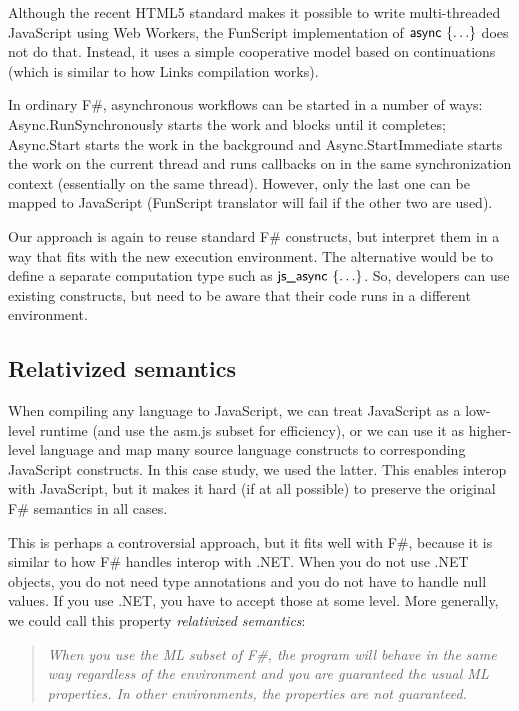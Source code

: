\documentclass[submission,copyright,creativecommons]{eptcs}
\newcommand{\kvd}[1]{\textnormal{\textcolor{kvdclr}{\sffamily #1}}}
\newcommand{\ident}[1]{\textnormal{\sffamily #1}}
\begin{document}
Although the recent HTML5 standard makes it possible to write multi-threaded JavaScript using
Web Workers, the FunScript implementation of $\ident{async}~\{ \ldots \}$ does not do that. 
Instead, it uses a simple cooperative model based on continuations (which is similar to how Links 
\cite{web-links} compilation works).

In ordinary F\#, asynchronous workflows can be started in a number of ways: \ident{Async.RunSynchronously}
starts the work and blocks until it completes; \ident{Async.Start} starts the work in the background
and \ident{Async.\-Start\-Immediate} starts the work on the current thread and runs callbacks on 
in the same synchronization context (essentially on the same thread). However, only the last one
can be mapped to JavaScript (FunScript translator will fail if the other two are used).

Our approach is again to reuse standard F\# constructs, but interpret them in a way that fits
with the new execution environment. The alternative would be to define a separate computation type
such as $\ident{js\_async}~\{ \ldots \}$. So, developers can use existing constructs, but need
to be aware that their code runs in a different environment.

\subsection{Relativized semantics}
\label{sec:js-relative}

When compiling any language to JavaScript, we can treat JavaScript as a low-level runtime
(and use the asm.js \cite{asm-js} subset for efficiency), or we can use it as 
higher-level language and map many source language constructs to corresponding JavaScript
constructs. In this case study, we used the latter. This enables interop with JavaScript, but 
it makes it hard (if at all possible) to preserve the original F\# semantics in all cases.

This is perhaps a controversial approach, but it fits well with F\#, because it is similar to 
how F\# handles interop with .NET. When you do not use .NET objects, you do not need type
annotations and you do not have to handle \kvd{null} values. If you use .NET, you have to
accept those at some level. More generally, we could call this property \emph{relativized
semantics}:

\begin{quotation}
\noindent
\emph{When you use the ML subset of F\#, the program will behave in the same way regardless
of the environment and you are guaranteed the usual ML properties. In other environments, 
the properties are not guaranteed.}
\end{quotation}
\end{document}
